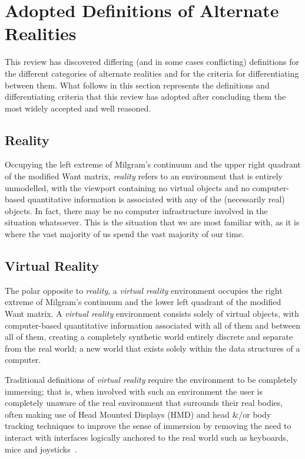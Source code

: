\section{Adopted Definitions of Alternate Realities}
\label{sec:definitions_of_alternate_realities}
This review has discovered differing (and in some cases conflicting) definitions for the different categories of alternate realities and for the criteria for differentiating between them. What follows in this section represents the definitions and differentiating criteria that this review has adopted after concluding them the most widely accepted and well reasoned.

\subsection{Reality}
Occupying the left extreme of Milgram's continuum and the upper right quadrant of the modified Want matrix, \textit{reality} refers to an environment that is entirely unmodelled, with the viewport containing no virtual objects and no computer-based quantitative information is associated with any of the (necessarily real) objects. In fact, there may be no computer infrastructure involved in the situation whatsoever. This is the situation that we are most familiar with, as it is where the vast majority of us spend the vast majority of our time.

\subsection{Virtual Reality}
The polar opposite to \textit{reality}, a \textit{virtual reality} environment occupies the right extreme of Milgram's continuum and the lower left quadrant of the modified Want matrix. A \textit{virtual reality} environment consists solely of virtual objects, with computer-based quantitative information associated with all of them and between all of them, creating a completely synthetic world entirely discrete and separate from the real world; a new world that exists solely within the data structures of a computer.%

Traditional definitions of \textit{virtual reality} require the environment to be completely immersing; that is, when involved with such an environment the user is completely unaware of the real environment that surrounds their real bodies, often making use of Head Mounted Displays (HMD) and head \&/or body tracking techniques to improve the sense of immersion by removing the need to interact with interfaces logically anchored to the real world such as keyboards, mice and joysticks~\cite{Druck2006}.

